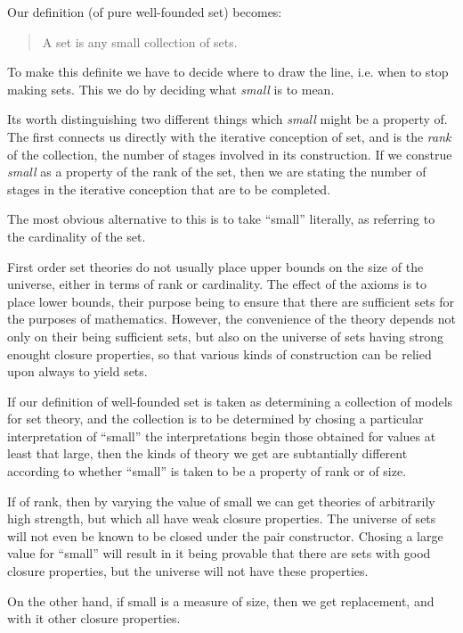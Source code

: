 Our definition (of pure well-founded set) becomes:

\begin{quote}
A set is any small collection of sets.
\end{quote}

To make this definite we have to decide where to draw the line, i.e. when to stop making sets.
This we do by deciding what {\it small} is to mean.

Its worth distinguishing two different things which {\it small} might be a property of.
The first connects us directly with the iterative conception of set, and is the {\it rank} of the collection, the number of stages involved in its construction.
If we construe {\it small} as a property of the rank of the set, then we are stating the number of stages in the iterative conception that are to be completed.

The most obvious alternative to this is to take ``small'' literally, as referring to the cardinality of the set.

First order set theories do not usually place upper bounds on the size of the universe, either in terms of rank or cardinality.
The effect of the axioms is to place lower bounds, their purpose being to ensure that there are sufficient sets for the purposes of mathematics.
However, the convenience of the theory depends not only on their being sufficient sets, but also on the universe of sets having strong enought closure properties, so that various kinds of construction can be relied upon always to yield sets.

If our definition of well-founded set is taken as determining a collection of models for set theory, and the collection is to be determined by chosing a particular interpretation of ``small'' the interpretations begin those obtained for values at least that large, then the kinds of theory we get are subtantially different according to whether ``small'' is taken to be a property of rank or of size.

If of rank, then by varying the value of small we can get theories of arbitrarily high strength, but which all have weak closure properties.
The universe of sets will not even be known to be closed under the pair constructor.
Chosing a large value for ``small'' will result in it being provable that there are sets with good closure properties, but the universe will not have these properties.

On the other hand, if small is a measure of size, then we get replacement, and with it other closure properties. 
